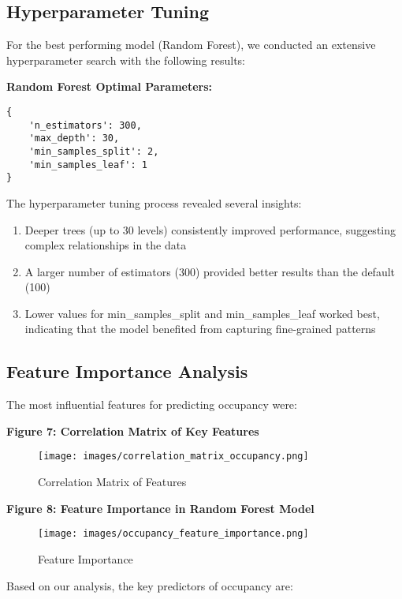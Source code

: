 \documentclass[12pt,letterpaper]{article}
\begin{document}
\subsection{Hyperparameter Tuning}

For the best performing model (Random Forest), we conducted an extensive hyperparameter search with the following results:

\textbf{Random Forest Optimal Parameters:}
\begin{verbatim}
{
    'n_estimators': 300,
    'max_depth': 30,
    'min_samples_split': 2,
    'min_samples_leaf': 1
}
\end{verbatim}

The hyperparameter tuning process revealed several insights:
\begin{enumerate}
    \item Deeper trees (up to 30 levels) consistently improved performance, suggesting complex relationships in the data
    \item A larger number of estimators (300) provided better results than the default (100)
    \item Lower values for min\_samples\_split and min\_samples\_leaf worked best, indicating that the model benefited from capturing fine-grained patterns
\end{enumerate}

\subsection{Feature Importance Analysis}

The most influential features for predicting occupancy were:

\textbf{Figure 7: Correlation Matrix of Key Features}

\begin{figure}[H]
    \centering
    \texttt{[image: images/correlation\_matrix\_occupancy.png]}
    \caption{Correlation Matrix of Features}
\end{figure}

\textbf{Figure 8: Feature Importance in Random Forest Model}

\begin{figure}[H]
    \centering
    \texttt{[image: images/occupancy\_feature\_importance.png]}
    \caption{Feature Importance}
\end{figure}

Based on our analysis, the key predictors of occupancy are:
\end{document}
